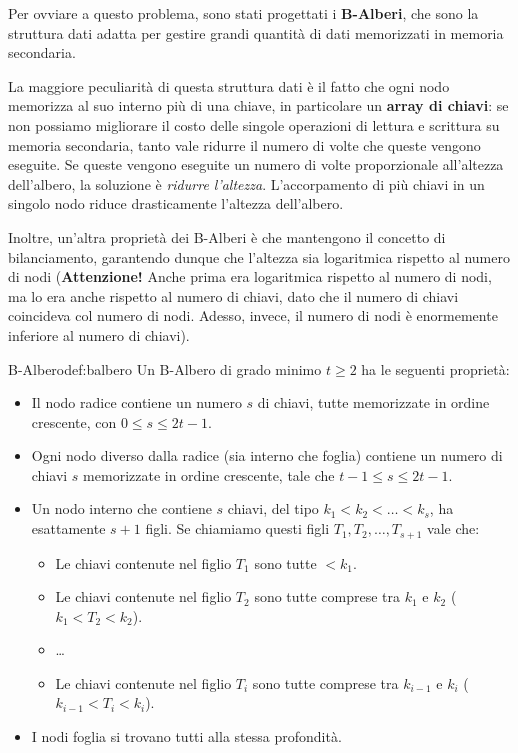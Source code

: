 \documentclass[12pt]{report}
\begin{document}
	Per ovviare a questo problema, sono stati progettati i \textbf{B-Alberi}, che sono la struttura dati adatta per gestire grandi quantità di dati memorizzati in memoria secondaria.
	
	La maggiore peculiarità di questa struttura dati è il fatto che ogni nodo memorizza al suo interno più di una chiave, in particolare un \textbf{array di chiavi}: se non possiamo migliorare il costo delle singole operazioni di lettura e scrittura su memoria secondaria, tanto vale ridurre il numero di volte che queste vengono eseguite. Se queste vengono eseguite un numero di volte proporzionale all'altezza dell'albero, la soluzione è \textit{ridurre l'altezza}. L'accorpamento di più chiavi in un singolo nodo riduce drasticamente l'altezza dell'albero.
	
	Inoltre, un'altra proprietà dei B-Alberi è che mantengono il concetto di bilanciamento, garantendo dunque che l'altezza sia logaritmica rispetto al numero di nodi (\textbf{Attenzione!} Anche prima era logaritmica rispetto al numero di nodi, ma lo era anche rispetto al numero di chiavi, dato che il numero di chiavi coincideva col numero di nodi. Adesso, invece, il numero di nodi è enormemente inferiore al numero di chiavi).
	
	\begin{definizione}{B-Albero}{def:balbero}
		Un B-Albero di grado minimo $t \geq 2$ ha le seguenti proprietà:
		\begin{itemize}
			\item Il nodo radice contiene un numero $s$ di chiavi, tutte memorizzate in ordine crescente, con $0 \leq s \leq 2t-1$.
			\item Ogni nodo diverso dalla radice (sia interno che foglia) contiene un numero di chiavi $s$ memorizzate in ordine crescente, tale che $t-1 \leq s \leq 2t-1$.
			\item Un nodo interno che contiene $s$ chiavi, del tipo $k_1 < k_2 < \dots < k_s$, ha esattamente $s+1$ figli. Se chiamiamo questi figli $T_1, T_2, \dots, T_{s+1}$ vale che:
			\begin{itemize}
				\item Le chiavi contenute nel figlio $T_1$ sono tutte $< k_1$.
				\item Le chiavi contenute nel figlio $T_2$ sono tutte comprese tra $k_1$ e $k_2$ ($k_1 < T_2 < k_2$).
				\item \dots
				\item Le chiavi contenute nel figlio $T_i$ sono tutte comprese tra $k_{i-1}$ e $k_i$ ($k_{i-1} < T_i < k_i$).
			\end{itemize}
			\item I nodi foglia si trovano tutti alla stessa profondità.
		\end{itemize}
	\end{definizione}
	
\end{document}
